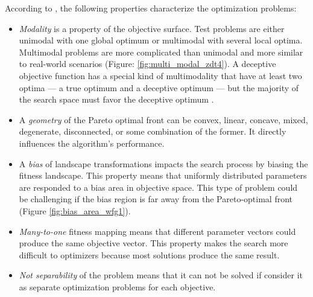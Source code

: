     According to \cite{WFGref}, the following properties characterize the optimization problems:
    \begin{itemize}
        \item \emph{Modality} is a property of the objective surface. Test problems are either unimodal with one global optimum or multimodal with several local optima. Multimodal problems are more complicated than unimodal and more similar to real-world scenarios (Figure: \ref{fig:multi_modal_zdt4}). A deceptive objective function has a special kind of multimodality that have at least two optima — a true optimum and a deceptive optimum — but the majority of the search space must favor the deceptive optimum \cite{Deb99}.
        \item A \emph{geometry} of the Pareto optimal front can be convex, linear, concave, mixed, degenerate, disconnected, or some combination of the former. It directly influences the algorithm's performance. 
        \item A \emph{bias} of landscape transformations impacts the search process by biasing the fitness landscape. This property means that uniformly distributed parameters are responded to a bias area in objective space. This type of problem could be challenging if the bias region is far away from the Pareto-optimal front (Figure \ref{fig:bias_area_wfg1}).
        \item \emph{Many-to-one} fitness mapping means that different parameter vectors could produce the same objective vector. This property makes the search more difficult to optimizers because most solutions produce the same result.
        \item \emph{Not separability } of the problem means that it can not be solved if consider it as separate optimization problems for each objective.
    \end{itemize}


